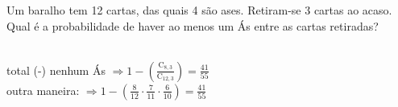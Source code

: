 \begin{ex}
 Um baralho tem 12 cartas, das quais 4 são ases. Retiram-se 3 cartas ao acaso. Qual é a probabilidade de haver ao menos um Ás entre as cartas retiradas?
  \begin{sol}
    \phantom{A} \\
    total (-) nenhum Ás \hspace{0,7cm}
    $\Longrightarrow 1-(\frac{\mathrm{C}_{8,3}}{\mathrm{C}_{{12},3}})=\frac{41}{55}$  \\
    outra maneira: $ \Longrightarrow1-(\frac{8}{12}\cdot\frac{7}{11}\cdot\frac{6}{10})=\frac{41}{55}$
  \end{sol}
\end{ex}